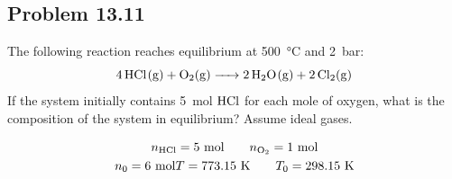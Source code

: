 

\subsection*{Problem 13.11}
The following reaction reaches equilibrium at
500~\unit{\degreeCelsius} and 2~\unit{\bar}:
\begin{equation*}
  \ce{4HCl(g) + O2(g) -> 2H2O(g) + 2Cl2(g)}
\end{equation*}
If the system initially contains 5~\unit{\mole} \(\ce{HCl}\) for each
mole of oxygen, what is the composition of the system in equilibrium?
Assume ideal gases.

\begin{solution}
  \begin{gather*}
    n_{\ce{HCl}} = 5~\unit{\mole} \qquad n_{\ce{O2}} = 1~\unit{\mole} \\
    n_0 = 6~\unit{\mole}
    T = 773.15~\unit{\kelvin} \qquad T_0 = 298.15~\unit{\kelvin}
  \end{gather*}
\end{solution}
